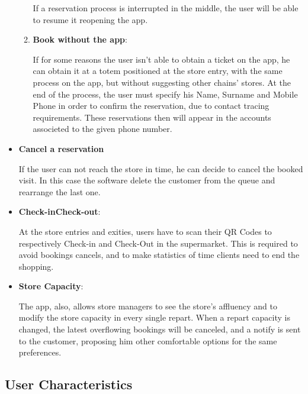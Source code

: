 \documentclass{article}
\begin{document}
\begin{itemize}
\begin{enumerate}
			If a reservation process is interrupted in the middle, the user will be able to resume it reopening the app. \\
			
			\item {\bfseries Book without the app}:
			
			If for some reasons the user isn't able to obtain a ticket on the app, he can obtain it at a totem positioned at the store entry, with the same process on the app, but without suggesting other chains' stores. At the end of the process, the user must specify his Name, Surname and Mobile Phone in order to confirm the reservation, due to contact tracing requirements. These reservations then will appear in the accounts associeted to the given phone number. \\
			
		\end{enumerate}
	
		\item {\bfseries Cancel a reservation}
		
		If the user can not reach the store in time, he can decide to cancel the booked visit. In this case the software delete the customer from the queue and rearrange the last one. \\
		
		\item {\bfseries Check-in\(\)Check-out}:
		
		At the store entries and exities, users have to scan their QR Codes to respectively Check-in and Check-Out in the supermarket. This is required to avoid bookings cancels, and to make statistics of time clients need to end the shopping. \\
		
		\item {\bfseries Store Capacity}:
		
		The app, also, allows store managers to see the store's affluency and to modify the store capacity in every single repart. When a repart capacity is changed, the latest overflowing bookings will be canceled, and a notify is sent to the customer, proposing him other comfortable options for the same preferences.\\
		
	\end{itemize}

	\subsection{User Characteristics}
	
\end{document}

